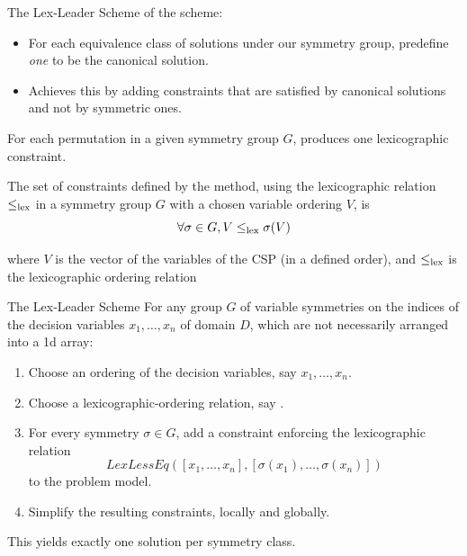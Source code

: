 \documentclass{cons-beamer}
\begin{document}
\begin{frame}{The Lex-Leader Scheme}\label{lex-leader}
   of the  scheme: 
  \begin{itemize}
    \item For each equivalence class of solutions
      under our symmetry group, predefine \textit{one} to be the canonical solution.
    \item Achieves this by adding constraints that are satisfied by canonical solutions and not by symmetric ones.
  \end{itemize}
  \vfill

  For each permutation in a given symmetry group $G$,  produces one lexicographic constraint. 
  \vfill

  The set of constraints defined by the  method, using the lexicographic relation $\leq_{\textnormal{lex}}$ in a symmetry group $G$ with a chosen variable ordering $V$, is
  $$\forall \sigma \in G, V \leq_{\textnormal{lex}} \sigma(V)$$

  where $V$ is the vector of the variables of the CSP (in a defined order), and $\leq_{\textnormal{lex}}$ is the lexicographic ordering
  relation
\end{frame}

\begin{frame}[fragile]{The Lex-Leader Scheme}
  For \alert{any} group $G$ of \alert{variable} symmetries on the
  indices of the decision variables $x_1,\dots,x_n$ of
  domain $D$, which are not necessarily arranged into a 1d array:
  \vfill

  \begin{enumerate}
    \item Choose an ordering of the decision variables, say
      $x_1,\dots,x_n$.  \vfill
    \item Choose a lexicographic-ordering relation,  say . \vfill
    \item For every symmetry $\sigma \in G$, add a constraint enforcing the lexicographic relation
      $$LexLessEq([x_1,\dots,x_n],[\sigma(x_1),\dots,\sigma(x_n)])$$
      to the problem model. \vfill
    \item Simplify the resulting constraints, locally and globally.
  \end{enumerate}\vfill

  This yields \alert{exactly} one solution per symmetry class.
\end{frame}
\end{document}
